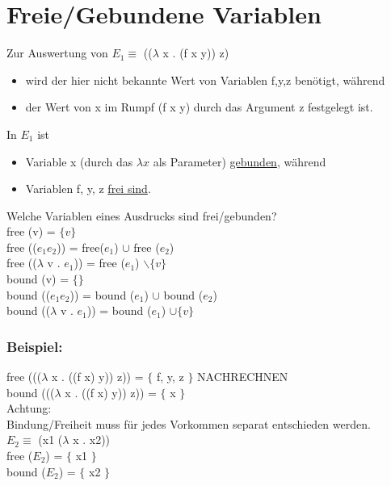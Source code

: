 \documentclass[a4paper, 20pt, openany]{book}
\begin{document}
\section{Freie/Gebundene Variablen}
Zur Auswertung von $E_1 \equiv$ (($\lambda$ x . (f x y)) z)\\
\begin{itemize}
\item wird der hier nicht bekannte Wert von Variablen f,y,z benötigt, während
\item der Wert von x im Rumpf (f x y)  durch das Argument z festgelegt ist.
\end{itemize}
In $E_1$ ist 
\begin{itemize}
\item Variable x (durch das $\lambda x$ als Parameter) \underline{gebunden}, während
\item Variablen f, y, z \underline{frei sind}.
\end{itemize}
Welche Variablen eines Ausdrucks sind frei/gebunden?\\
free (v) = $\lbrace v \rbrace$\\
free (($e_1 e_2$)) = free($e_1$) $\cup$ free ($e_2$)\\
free (($\lambda$ v . $e_1$)) = free ($e_1$) $\backslash \lbrace v \rbrace$\\
bound (v) = $\lbrace \rbrace$\\
bound (($e_1 e_2$)) = bound ($e_1$) $\cup$ bound ($e_2$)\\
bound (($\lambda$ v . $e_1$)) = bound ($e_1$) $\cup \lbrace v \rbrace$

\subsubsection{Beispiel:}
free ((($\lambda$ x . ((f x) y)) z)) = $\lbrace$ f, y, z $\rbrace$ NACHRECHNEN\\
bound ((($\lambda$ x . ((f x) y)) z)) = $\lbrace$ x $\rbrace$\\
Achtung:\\
Bindung/Freiheit muss für jedes Vorkommen separat entschieden werden.\\
$E_2 \equiv$ (x1 ($\lambda$ x . x2))\\
free ($E_2$) = $\lbrace$ x1 $\rbrace$\\
bound ($E_2$) = $\lbrace$ x2 $\rbrace$
\end{document}
